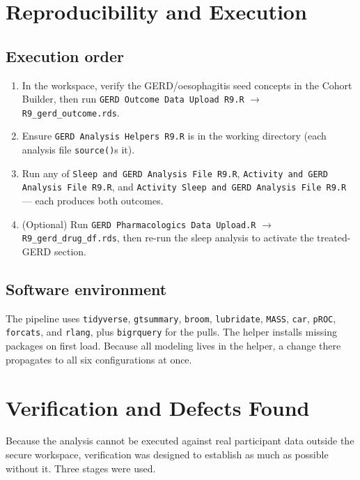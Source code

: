 \documentclass[11pt]{article}
\newcommand{\code}[1]{\texttt{\small #1}}
\begin{document}
\section{Reproducibility and Execution}
\subsection{Execution order}
\begin{enumerate}[leftmargin=1.6em,itemsep=1pt]
  \item In the workspace, verify the GERD/oesophagitis seed concepts in the Cohort Builder, then run
  \code{GERD Outcome Data Upload R9.R} $\rightarrow$ \code{R9_gerd_outcome.rds}.
  \item Ensure \code{GERD Analysis Helpers R9.R} is in the working directory (each analysis file
  \code{source()}s it).
  \item Run any of \code{Sleep and GERD Analysis File R9.R}, \code{Activity and GERD Analysis File
  R9.R}, and \code{Activity Sleep and GERD Analysis File R9.R} --- each produces both outcomes.
  \item (Optional) Run \code{GERD Pharmacologics Data Upload.R} $\rightarrow$ \code{R9_gerd_drug_df.rds},
  then re-run the sleep analysis to activate the treated-GERD section.
\end{enumerate}
\subsection{Software environment}
The pipeline uses \code{tidyverse}, \code{gtsummary}, \code{broom}, \code{lubridate}, \code{MASS},
\code{car}, \code{pROC}, \code{forcats}, and \code{rlang}, plus \code{bigrquery} for the pulls. The
helper installs missing packages on first load. Because all modeling lives in the helper, a change
there propagates to all six configurations at once.

\section{Verification and Defects Found}
\label{sec:verify}
Because the analysis cannot be executed against real participant data outside the secure workspace,
verification was designed to establish as much as possible without it. Three stages were used.
\end{document}
